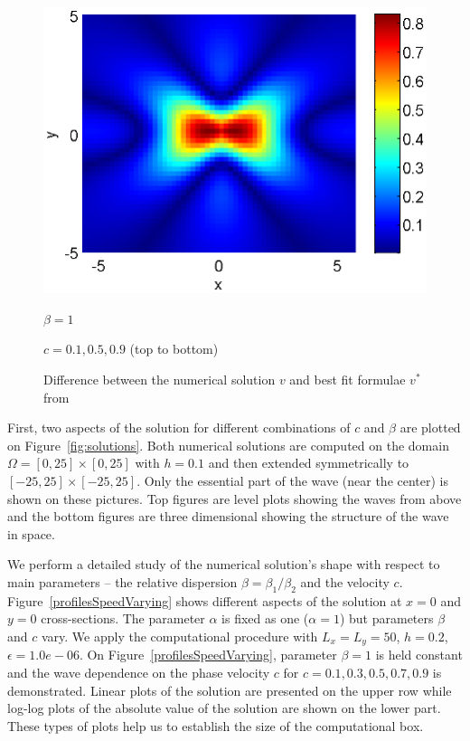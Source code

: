 \documentclass[leqno,11pt]{book}
\begin{document}
\begin{figure}[htbp]
\begin{minipage}[b]{0.48\linewidth}
		 \includegraphics[width=\linewidth]{differences/difference_c=09_beta=1.eps}
		\centerline{$\beta = 1$}
		\centerline{$c = 0.1, 0.5, 0.9$ (top to bottom)}
	\end{minipage}
	\caption{Difference between the numerical solution $v$ and best fit formulae $v^*$ from \cite{Ch2011} }
	\label{fig:difference}
\end{figure}

First, two aspects of the solution for different combinations of  $c$ and $\beta$   are plotted  on Figure~\ref{fig:solutions}. Both numerical solutions are computed on the  domain $\Omega = [0, 25]\times [0, 25]$ with $h = 0.1$ and then extended symmetrically to $ [-25, 25]\times [-25, 25]$. 
Only the essential part of the wave (near the center) is shown on these pictures. Top figures are level plots showing the waves from above and the bottom figures are 
three dimensional showing the structure of the wave in space. 



We perform a detailed study   of the numerical solution's shape with respect to main parameters -- the relative dispersion $\beta=\beta_1 / \beta_2$ and the velocity $c$.
 Figure~\ref{profilesSpeedVarying} shows different aspects of the solution at $x=0$ and $y=0$ cross-sections. The parameter $\alpha$  is fixed as one ($\alpha = 1$) but  parameters $\beta $ and $c$ vary. We apply  the computational procedure with  $L_x = L_y = 50$, $h = 0.2$, $\epsilon = 1.0e-06$. 
On Figure~\ref{profilesSpeedVarying}, parameter $\beta=1$ is held constant and the wave dependence on the phase velocity  $c$ for $c=0.1, 0.3, 0.5, 0.7, 0.9$ is demonstrated.  Linear plots of the solution are presented on the upper row while  log-log plots of the absolute value of the solution are shown on the lower part.  These types of plots help us to establish the size of the computational box. 
\end{document}

